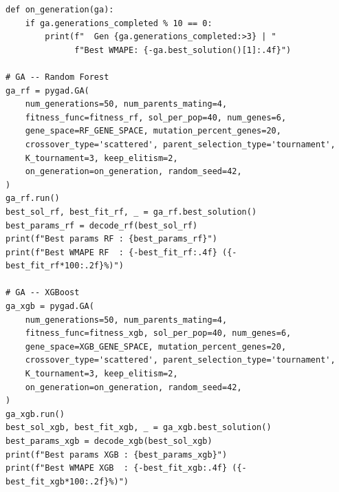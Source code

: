 \begin{lstlisting}[style=pycode,caption={Eksekusi GA untuk Random Forest dan XGBoost}]
def on_generation(ga):
    if ga.generations_completed % 10 == 0:
        print(f"  Gen {ga.generations_completed:>3} | "
              f"Best WMAPE: {-ga.best_solution()[1]:.4f}")

# GA -- Random Forest
ga_rf = pygad.GA(
    num_generations=50, num_parents_mating=4,
    fitness_func=fitness_rf, sol_per_pop=40, num_genes=6,
    gene_space=RF_GENE_SPACE, mutation_percent_genes=20,
    crossover_type='scattered', parent_selection_type='tournament',
    K_tournament=3, keep_elitism=2,
    on_generation=on_generation, random_seed=42,
)
ga_rf.run()
best_sol_rf, best_fit_rf, _ = ga_rf.best_solution()
best_params_rf = decode_rf(best_sol_rf)
print(f"Best params RF : {best_params_rf}")
print(f"Best WMAPE RF  : {-best_fit_rf:.4f} ({-best_fit_rf*100:.2f}%)")

# GA -- XGBoost
ga_xgb = pygad.GA(
    num_generations=50, num_parents_mating=4,
    fitness_func=fitness_xgb, sol_per_pop=40, num_genes=6,
    gene_space=XGB_GENE_SPACE, mutation_percent_genes=20,
    crossover_type='scattered', parent_selection_type='tournament',
    K_tournament=3, keep_elitism=2,
    on_generation=on_generation, random_seed=42,
)
ga_xgb.run()
best_sol_xgb, best_fit_xgb, _ = ga_xgb.best_solution()
best_params_xgb = decode_xgb(best_sol_xgb)
print(f"Best params XGB : {best_params_xgb}")
print(f"Best WMAPE XGB  : {-best_fit_xgb:.4f} ({-best_fit_xgb*100:.2f}%)")
\end{lstlisting}

